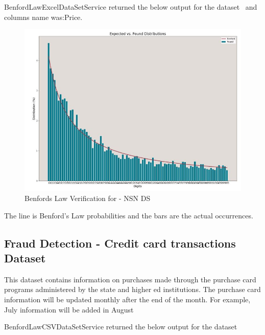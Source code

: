 BenfordLawExcelDataSetService returned the below
output for the dataset~\cite{hid-sp18-514-excelDatalocation}
and columns name was:Price.

\begin{figure}[!ht]
\centering\includegraphics[width=\columnwidth]{images/benford_nsn.JPG}
  \caption{Benfords Law Verification for - NSN DS}\label{f:NSN-ds-benfordlaw}
\end{figure}

The line is Benford’s Law probabilities and the bars are 
the actual occurrences.


\subsection{Fraud Detection - Credit card transactions Dataset}
This dataset contains information on purchases made through 
the purchase card programs administered by the state and higher 
ed institutions. The purchase card information will be updated monthly 
after the end of the month. For example, July information will 
be added in August~\cite{hid-sp18-514-purchase-card-desc}

BenfordLawCSVDataSetService returned the below
output for the dataset~\cite{hid-sp18-514-purchase-card-ds}

